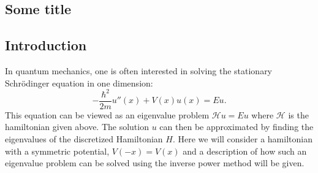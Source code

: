\documentclass[twocolumn]{article}
\begin{document}
\begin{large}
\section*{Some title}
\subsection*{Introduction}
In quantum mechanics, one is often interested in solving the stationary Schrödinger equation in one dimension:
\begin{equation}
    -\frac{\hbar^2}{2m}u''(x) + V(x)u(x) = Eu.
\end{equation}
This equation can be viewed as an eigenvalue problem $\mathcal{H}u = Eu$ where $\mathcal{H}$ is the hamiltonian given above. The solution $u$ can then be approximated by finding the eigenvalues of the discretized Hamiltonian $H$. Here we will consider a hamiltonian with a symmetric potential, $V(-x) = V(x)$ and a description of how such an eigenvalue problem can be solved using the inverse power method will be given.


\end{large}
\end{document}
